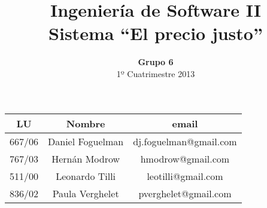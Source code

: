 \documentclass[a4paper,8pt]{article}
\title{Ingeniería de Software II\\ \textbf{Sistema ``El precio justo''}}
\author{\textbf{Grupo 6}\\ 1º Cuatrimestre 2013}
\date{}
\begin{document}
\maketitle
\vspace{10cm}
\begin{center}

\begin{tabular}{|c|c|c|}
\hline
\hline
\textbf{LU}&\textbf{Nombre}&\textbf{email}\\
\hline
667/06&Daniel Foguelman &dj.foguelman@gmail.com\\
\hline
767/03&Hernán Modrow&hmodrow@gmail.com\\
\hline
511/00&Leonardo Tilli&leotilli@gmail.com\\
\hline
836/02&Paula Verghelet&pverghelet@gmail.com\\
\hline
\hline
\end{tabular}
\end{center}
\newpage






\end{document}
